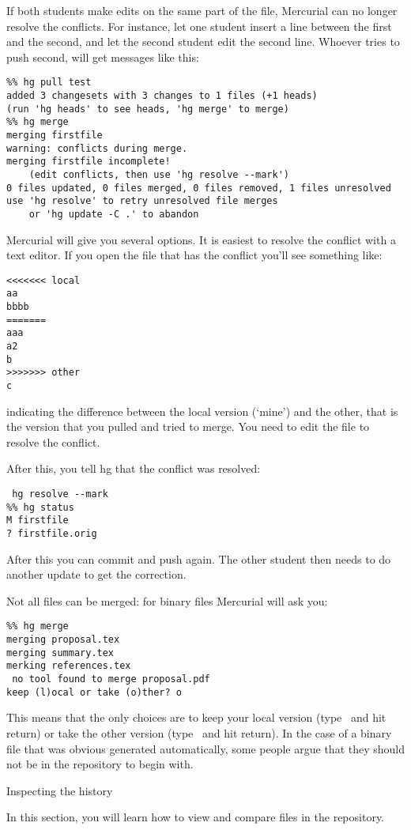 If both students make edits on the same part of the file, Mercurial can no
longer resolve the conflicts. For instance, let one student insert a
line between the first and the second, and let the second student edit
the second line. Whoever tries to push second, will get messages
like this:
{\small
\begin{verbatim}
%% hg pull test
added 3 changesets with 3 changes to 1 files (+1 heads)
(run 'hg heads' to see heads, 'hg merge' to merge)
%% hg merge
merging firstfile
warning: conflicts during merge.
merging firstfile incomplete! 
    (edit conflicts, then use 'hg resolve --mark')
0 files updated, 0 files merged, 0 files removed, 1 files unresolved
use 'hg resolve' to retry unresolved file merges 
    or 'hg update -C .' to abandon
\end{verbatim}
}
Mercurial will give you several options. It is easiest to resolve the
conflict with a text editor. If you open the file that has the conflict
you'll see something like:
\begin{verbatim}
<<<<<<< local
aa
bbbb
=======
aaa
a2
b
>>>>>>> other
c
\end{verbatim}
indicating the difference between the local version (`mine') and the
other, that is the version that you pulled and tried to merge.
You need to edit the file to resolve the conflict.

After this, you tell hg that the conflict was resolved:
\begin{verbatim}
 hg resolve --mark
%% hg status
M firstfile
? firstfile.orig
\end{verbatim}
After this you can commit and push again.
The other student then needs to do another update to get the
correction.

Not all files can be merged: for binary files Mercurial will ask you:
\begin{verbatim}
%% hg merge
merging proposal.tex
merging summary.tex
merking references.tex
 no tool found to merge proposal.pdf
keep (l)ocal or take (o)ther? o
\end{verbatim}
This means that the only choices are to keep your local version
(type~ and hit return) or take the other version (type~ and
hit return). In the case of a binary file that was obvious generated
automatically, some people argue that they should not be in the
repository to begin with.

 {Inspecting the history}

\begin{purpose}
  In this section, you will learn how to view and compare files in the
  repository.
\end{purpose}

